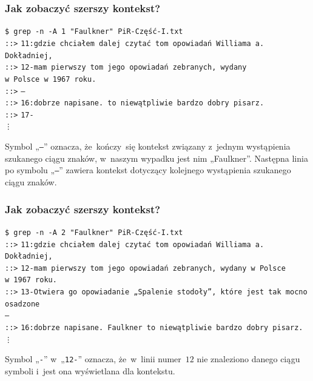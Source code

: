 \documentclass[10pt,t]{beamer}
\begin{document}
\begin{frame}
  \frametitle{Jak zobaczyć szerszy kontekst?}


  \texttt{\$ grep -n -A 1 "Faulkner"{} PiR-Część-I.txt} \\
  \texttt{::>} \texttt{11:gdzie chciałem dalej czytać tom opowiadań
    Williama a. Dokładniej,} \\
  \texttt{::>} \texttt{12-mam pierwszy tom jego opowiadań zebranych,
    wydany} \\
  \texttt{w~Polsce w~1967 roku.} \\
  \texttt{::>} \texttt{--} \\
  \texttt{::>} \texttt{16:dobrze napisane.  to
    niewątpliwie bardzo dobry pisarz.} \\
  \texttt{::>} \texttt{17-} \\
  \hspace{2em} \texttt{\vdots}

  Symbol „\texttt{--}” oznacza, że~kończy~się kontekst związany z~jednym
  wystąpienia szukanego ciągu znaków, w~naszym wypadku jest nim „Faulkner”.
  Następna linia po symbolu „\texttt{--}” zawiera kontekst dotyczący
  kolejnego wystąpienia szukanego ciągu znaków.

\end{frame}





\begin{frame}
  \frametitle{Jak zobaczyć szerszy kontekst?}


  \texttt{\$ grep -n -A 2 "Faulkner"{} PiR-Część-I.txt} \\
  \texttt{::>} \texttt{11:gdzie chciałem dalej czytać tom opowiadań
    Williama a. Dokładniej,} \\
  \texttt{::>} \texttt{12-mam pierwszy tom jego opowiadań zebranych, wydany
    w~Polsce w~1967 roku.} \\
  \texttt{::>} \texttt{13-Otwiera go opowiadanie „Spalenie stodoły”, które
    jest tak mocno osadzone} \\
  \texttt{--} \\
  \texttt{::>} \texttt{16:dobrze napisane. Faulkner to niewątpliwie bardzo
    dobry pisarz.} \\
  \hspace{2em} \texttt{\vdots}

  Symbol „\texttt{-}” w~„\texttt{12-}” oznacza, że~w~linii numer~$12$ nie
  znaleziono danego ciągu symboli i~jest ona wyświetlana dla kontekstu.

\end{frame}
\end{document}
